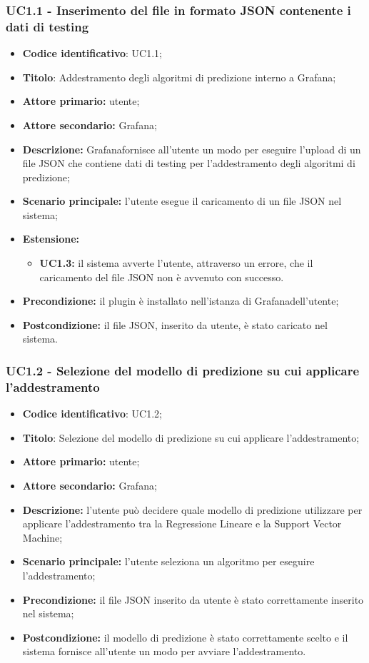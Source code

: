 \documentclass{article}
\begin{document}
	\subsubsection{UC1.1 - Inserimento del file in formato JSON contenente i dati di testing}
	\begin{itemize}
		\item \textbf{Codice identificativo}: UC1.1;
		\item \textbf{Titolo}: Addestramento degli algoritmi di predizione interno a Grafana;
		\item \textbf{Attore primario:} utente;
		\item \textbf{Attore secondario:} Grafana\glo;
		\item \textbf{Descrizione:} Grafana\glosp fornisce all'utente un modo per eseguire l'upload di un file JSON che contiene dati di testing per l'addestramento degli algoritmi di predizione;
		\item \textbf{Scenario principale:} l'utente esegue il caricamento di un file JSON nel sistema;
		\item \textbf{Estensione:}
			\begin{itemize}
				\item \textbf{UC1.3:} il sistema avverte l'utente, attraverso un errore, che il caricamento del file JSON non è avvenuto con successo.
			\end{itemize}
		\item \textbf{Precondizione:} il plugin è installato nell'istanza di Grafana\glosp dell'utente;
		\item \textbf{Postcondizione:} il file JSON, inserito da utente, è stato caricato nel sistema.
	\end{itemize}

	\subsubsection{UC1.2 - Selezione del modello di predizione su cui applicare l'addestramento}
	\begin{itemize}
		\item \textbf{Codice identificativo}: UC1.2;
		\item \textbf{Titolo}: Selezione del modello di predizione su cui applicare l'addestramento;
		\item \textbf{Attore primario:} utente;
		\item \textbf{Attore secondario:} Grafana\glo;
		\item \textbf{Descrizione:} l'utente può decidere quale modello di predizione utilizzare per applicare l'addestramento tra la Regressione Lineare e la Support Vector Machine;
		\item \textbf{Scenario principale:} l'utente seleziona un algoritmo per eseguire l'addestramento;
		\item \textbf{Precondizione:} il file JSON inserito da utente è stato correttamente inserito nel sistema;
		\item \textbf{Postcondizione:} il modello di predizione è stato correttamente scelto e il sistema fornisce all'utente un modo per avviare l'addestramento.
	\end{itemize}
\end{document}
